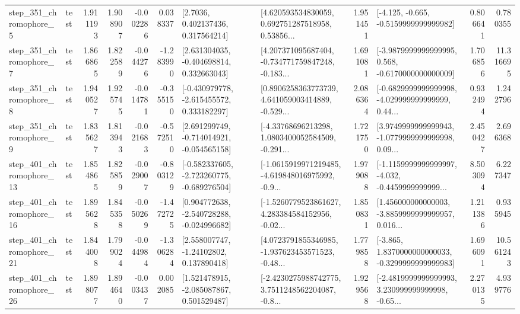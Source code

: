 \begin{tabular}{llrrrrllrlrr}
   step\_351\_chromophore\_5 &      test &      1.911193 &    1.908907 &     -0.002286 &  0.038337 &          [2.7036, 0.402137436, 0.317564214] &  [4.620593534830059, 0.692751287518958, 0.53856... &       1.951451 &              [-4.125, -0.665, -0.5159999999999982] &            0.806641 &          0.780355 \\
   step\_351\_chromophore\_7 &      test &      1.866865 &    1.822589 &     -0.044276 & -1.283990 &    [2.631304035, -0.404698814, 0.332663043] &  [4.207371095687404, -0.734771759847248, -0.183... &       1.691081 &  [-3.9879999999999995, 0.568, -0.6170000000000009] &            1.706856 &         11.316695 \\
   step\_351\_chromophore\_8 &      test &      1.940527 &    1.925745 &     -0.014781 & -0.355150 &   [-0.430979778, -2.615455572, 0.333182297] &  [0.8906258363773739, 4.641059003414889, -0.529... &       2.086364 &  [-0.6829999999999998, -4.029999999999999, 0.44... &            0.932494 &          1.242796 \\
   step\_351\_chromophore\_9 &      test &      1.835627 &    1.813943 &     -0.021683 & -0.572510 &   [2.691299749, -0.714014921, -0.054565158] &  [-4.33768696213298, 1.0803400052584509, -0.291... &       1.721750 &  [3.9749999999999943, -1.0779999999999998, 0.09... &            2.450427 &          2.696368 \\
  step\_401\_chromophore\_13 &      test &      1.854865 &    1.825859 &     -0.029007 & -0.803129 &  [-0.582337605, -2.723260775, -0.689276504] &  [-1.0615919971219485, -4.619848016975992, -0.9... &       1.979088 &  [-1.1159999999999997, -4.032, -0.4459999999999... &            8.503094 &          6.227347 \\
  step\_401\_chromophore\_16 &      test &      1.895628 &    1.845358 &     -0.050269 & -1.472725 &   [0.904772638, -2.540728288, -0.024996682] &  [-1.5260779523861627, 4.283384584152956, -0.02... &       1.850831 &  [1.456000000000003, -3.8859999999999957, 0.016... &            1.211386 &          0.935945 \\
  step\_401\_chromophore\_21 &      test &      1.844008 &    1.799024 &     -0.044984 & -1.306284 &     [2.558007747, -1.24102802, 0.137890418] &  [4.0723791855346985, -1.937623453571523, -0.48... &       1.779858 &  [-3.865, 1.8370000000000033, -0.3299999999999983] &            1.696091 &         10.561243 \\
  step\_401\_chromophore\_26 &      test &      1.898077 &    1.894640 &     -0.003437 &  0.002085 &    [1.521478915, -2.085087867, 0.501529487] &  [-2.4230275988742775, 3.7511248562204087, -0.8... &       1.929568 &  [-2.4819999999999993, 3.230999999999998, -0.65... &            2.270135 &          4.939776 \\

\end{tabular}
